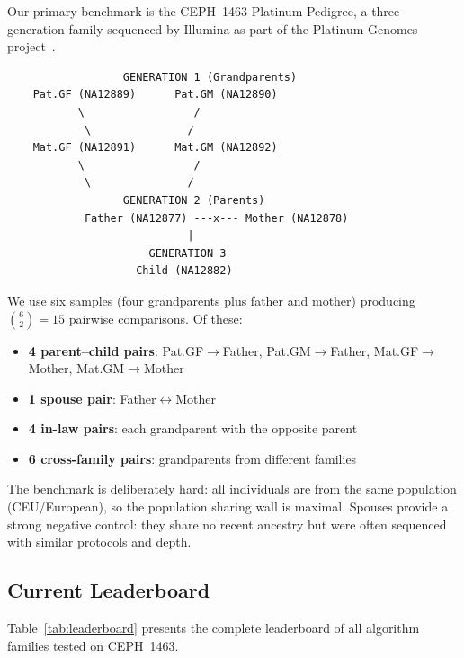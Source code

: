 \documentclass{../yalumba}
\begin{document}
Our primary benchmark is the CEPH~1463 Platinum Pedigree, a
three-generation family sequenced by Illumina as part of the Platinum
Genomes project~\cite{ceph1463}.

\begin{pedigree}
\begin{verbatim}
                  GENERATION 1 (Grandparents)
    Pat.GF (NA12889)      Pat.GM (NA12890)
           \                 /
            \               /
    Mat.GF (NA12891)      Mat.GM (NA12892)
           \                 /
            \               /
                  GENERATION 2 (Parents)
            Father (NA12877) ---x--- Mother (NA12878)
                            |
                      GENERATION 3
                    Child (NA12882)
\end{verbatim}
\end{pedigree}

We use six samples (four grandparents plus father and mother) producing
$\binom{6}{2} = 15$ pairwise comparisons.  Of these:

\begin{itemize}
  \item \textbf{4 parent--child pairs}: Pat.GF$\to$Father,
    Pat.GM$\to$Father, Mat.GF$\to$Mother, Mat.GM$\to$Mother
  \item \textbf{1 spouse pair}: Father$\leftrightarrow$Mother
  \item \textbf{4 in-law pairs}: each grandparent with the opposite
    parent
  \item \textbf{6 cross-family pairs}: grandparents from different
    families
\end{itemize}

The benchmark is deliberately hard: all individuals are from the same
population (CEU/European), so the population sharing wall is
maximal.  Spouses provide a strong negative control: they share no
recent ancestry but were often sequenced with similar protocols and
depth.

\subsection{Current Leaderboard}
\label{sec:status:leaderboard}

Table~\ref{tab:leaderboard} presents the complete leaderboard of all
algorithm families tested on CEPH~1463.
\end{document}
